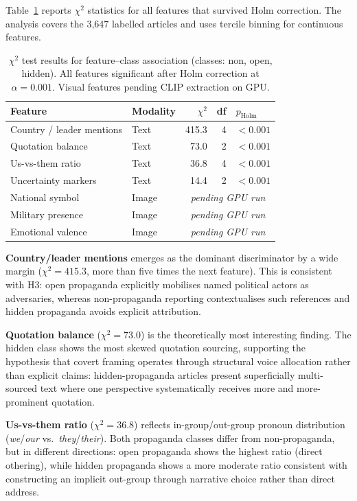 \documentclass[12pt,a4paper]{article}
\begin{document}
Table~\ref{tab:chi2} reports $\chi^2$ statistics for all features that survived
Holm correction.
The analysis covers the 3,647 labelled articles and uses tercile binning for
continuous features.

\begin{table}[H]
\centering
\caption{$\chi^2$ test results for feature--class association (classes: non, open, hidden).
All features significant after Holm correction at $\alpha = 0.001$.
Visual features pending CLIP extraction on GPU.}
\label{tab:chi2}
\begin{tabular}{llrrl}
\toprule
Feature & Modality & $\chi^2$ & df & $p_{\text{Holm}}$ \\
\midrule
Country / leader mentions & Text & 415.3 & 4 & $<0.001$ \\
Quotation balance & Text & 73.0 & 2 & $<0.001$ \\
Us-vs-them ratio & Text & 36.8 & 4 & $<0.001$ \\
Uncertainty markers & Text & 14.4 & 2 & $<0.001$ \\
\midrule
National symbol & Image & \multicolumn{3}{c}{\textit{pending GPU run}} \\
Military presence & Image & \multicolumn{3}{c}{\textit{pending GPU run}} \\
Emotional valence & Image & \multicolumn{3}{c}{\textit{pending GPU run}} \\
\bottomrule
\end{tabular}
\end{table}

\textbf{Country/leader mentions} emerges as the dominant discriminator by a
wide margin ($\chi^2 = 415.3$, more than five times the next feature).
This is consistent with H3: open propaganda explicitly mobilises named political
actors as adversaries, whereas non-propaganda reporting contextualises such
references and hidden propaganda avoids explicit attribution.

\textbf{Quotation balance} ($\chi^2 = 73.0$) is the theoretically most
interesting finding.
The hidden class shows the most skewed quotation sourcing, supporting the
hypothesis that covert framing operates through structural voice allocation
rather than explicit claims: hidden-propaganda articles present superficially
multi-sourced text where one perspective systematically receives more and
more-prominent quotation.

\textbf{Us-vs-them ratio} ($\chi^2 = 36.8$) reflects in-group/out-group
pronoun distribution (\emph{we}/\emph{our} vs.\ \emph{they}/\emph{their}).
Both propaganda classes differ from non-propaganda, but in different directions:
open propaganda shows the highest ratio (direct othering), while hidden
propaganda shows a more moderate ratio consistent with constructing an implicit
out-group through narrative choice rather than direct address.
\end{document}
